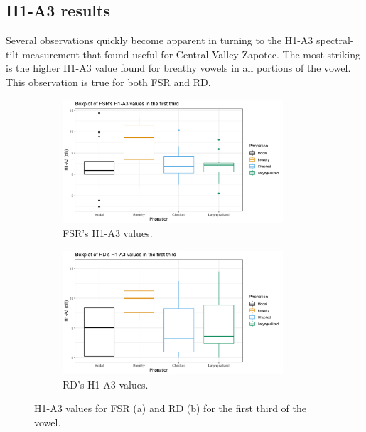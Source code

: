 \documentclass[12pt, letterpaper]{article}
\begin{document}
\subsection{H1-A3 results} \label{sec:H1A3}

Several observations quickly become apparent in turning to the H1-A3 spectral-tilt measurement that \citet{espositoVariationContrastivePhonation2010} found useful for Central Valley Zapotec. The most striking is the higher H1-A3 value found for breathy vowels in all portions of the vowel. This observation is true for both FSR and RD. 

\begin{figure}[!h]
	\centering
	\begin{subfigure}{.5\textwidth}
		\centering
		\includegraphics[width=0.9\textwidth]{Images/mean_FSR_h1a3_First.png}
		\caption{FSR's H1-A3 values.}
		\label{fig:FSRh1a3first} 
	\end{subfigure}%
	\begin{subfigure}{.5\textwidth}
		\centering
		\includegraphics[width=0.9\textwidth]{Images/mean_RD_h1a3_First.png}
		\caption{RD's H1-A3 values.}
		\label{fig:RDh1a3first} 
	\end{subfigure}
	\caption{H1-A3 values for FSR (a) and RD (b) for the first third of the vowel. }
	\label{fig:h1a3first}
\end{figure}
\end{document}
